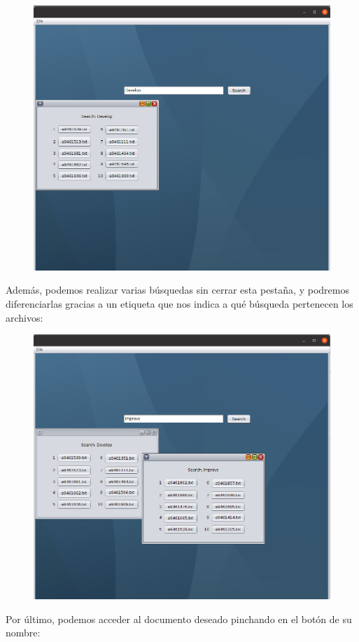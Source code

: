 \begin{figure}[H]
	\centering
	\includegraphics[width=0.7\linewidth]{Imagenes/screenshot006}
	\label{fig:screenshot006}
\end{figure}

Además, podemos realizar varias búsquedas sin cerrar esta pestaña, y podremos diferenciarlas gracias a un etiqueta que nos indica a qué búsqueda pertenecen los archivos:


\begin{figure}[H]
	\centering
	\includegraphics[width=0.7\linewidth]{Imagenes/screenshot007}
	\label{fig:screenshot007}
\end{figure}

Por último, podemos acceder al documento deseado pinchando en el botón de su nombre:

